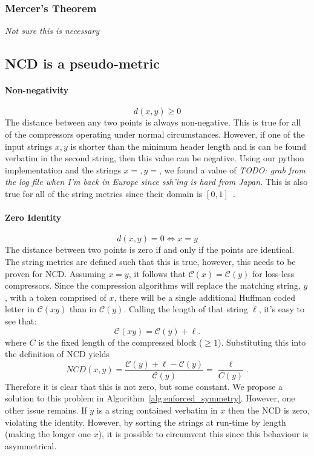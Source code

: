 \documentclass[conference]{IEEEtran}
\newcommand{\cm}[1]{\textit{{\color{blue}#1}}}
\begin{document}
\subsubsection{Mercer's Theorem}
\cm{Not sure this is necessary}



\subsection{NCD is a pseudo-metric}
\paragraph{Non-negativity} 
\[
d(x, y) \geq 0
\]
The distance between any two points is always non-negative. This is true for all of the compressors operating under normal circumstances. However, if one of the input strings $x,y$ is shorter than the minimum header length and is can be found verbatim in the second string, then this value can be negative. Using our python implementation and the strings $x=, y=$, we found a value of \cm{TODO: grab from the log file when I'm back in Europe since ssh'ing is hard from Japan}. This is also true for all of the string metrics since their domain is $[0,1]$~\cite{metrics,levenshtein}. 


\paragraph{Zero Identity} 
\[
d(x, y) = 0 \iff x = y
\]
The distance between two points is zero if and only if the points are identical. The string metrics are defined such that this is true, however, this needs to be proven for NCD.
Assuming $x = y$, it follows that $\mathcal{C}(x) = \mathcal{C}(y)$ for loss-less compressors.
Since the compression algorithms will replace the matching string, $y$, with a token comprised of $x$, there will be a single additional Huffman coded letter in $\mathcal{C}(xy)$ than in $\mathcal{C}(y)$. Calling the length of that  string $\ell$, it's easy to see that:
$$
\mathcal{C}(xy) = \mathcal{C}(y) + \ell.
$$
where $C$ is the fixed length of the compressed block ($\geq 1$).
Substituting this into the definition of NCD yields
$$
NCD(x,y) = \frac{\mathcal{C}(y) + \ell - \mathcal{C}(y)}{\mathcal{C}(y)} = \frac{\ell}{C(y)}.
$$
Therefore it is clear that this is not zero, but some constant. We propose a solution to this problem in Algorithm~\ref{alg:enforced_symmetry}. However, one other issue remains. If $y$ is a string contained verbatim in $x$ then the NCD is zero, violating the identity. However, by sorting the strings at run-time by length (making the longer one $x$), it is possible to circumvent this since this behaviour is asymmetrical. 
\end{document}
